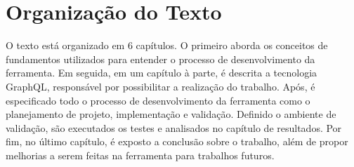 \section[Organização do Texto]{Organização do Texto}

O texto está organizado em 6 capítulos. O primeiro aborda os conceitos de fundamentos utilizados para entender o processo de desenvolvimento da ferramenta. Em seguida, em um capítulo à parte, é descrita a tecnologia GraphQL, responsável por possibilitar a realização do trabalho. Após, é especificado todo o processo de desenvolvimento da ferramenta como o planejamento de projeto, implementação e validação. Definido o ambiente de validação, são executados os testes e analisados no capítulo de resultados. Por fim, no último capítulo, é exposto a conclusão sobre o trabalho, além de propor melhorias a serem feitas na ferramenta para trabalhos futuros.
